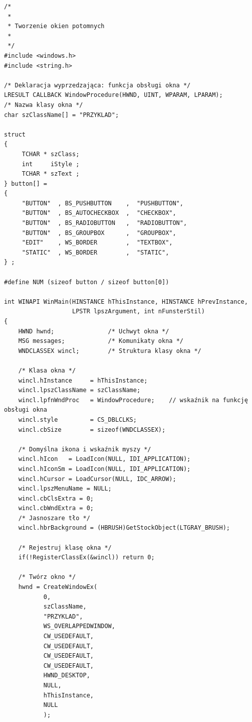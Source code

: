 \begin{scriptsize}
\begin{verbatim}
/*
 *
 * Tworzenie okien potomnych
 *
 */
#include <windows.h>
#include <string.h>

/* Deklaracja wyprzedzająca: funkcja obsługi okna */
LRESULT CALLBACK WindowProcedure(HWND, UINT, WPARAM, LPARAM);
/* Nazwa klasy okna */
char szClassName[] = "PRZYKLAD";

struct
{
     TCHAR * szClass;
     int     iStyle ;
     TCHAR * szText ;
} button[] =
{
     "BUTTON"  , BS_PUSHBUTTON    ,  "PUSHBUTTON",
     "BUTTON"  , BS_AUTOCHECKBOX  ,  "CHECKBOX",
     "BUTTON"  , BS_RADIOBUTTON   ,  "RADIOBUTTON",
     "BUTTON"  , BS_GROUPBOX      ,  "GROUPBOX",
     "EDIT"    , WS_BORDER        ,  "TEXTBOX",
     "STATIC"  , WS_BORDER        ,  "STATIC",
} ;

#define NUM (sizeof button / sizeof button[0])

int WINAPI WinMain(HINSTANCE hThisInstance, HINSTANCE hPrevInstance, 
                   LPSTR lpszArgument, int nFunsterStil)
{
    HWND hwnd;               /* Uchwyt okna */
    MSG messages;            /* Komunikaty okna */
    WNDCLASSEX wincl;        /* Struktura klasy okna */

    /* Klasa okna */
    wincl.hInstance     = hThisInstance;
    wincl.lpszClassName = szClassName;
    wincl.lpfnWndProc   = WindowProcedure;    // wskaźnik na funkcję obsługi okna  
    wincl.style         = CS_DBLCLKS;                 
    wincl.cbSize        = sizeof(WNDCLASSEX);

    /* Domyślna ikona i wskaźnik myszy */
    wincl.hIcon   = LoadIcon(NULL, IDI_APPLICATION);
    wincl.hIconSm = LoadIcon(NULL, IDI_APPLICATION);
    wincl.hCursor = LoadCursor(NULL, IDC_ARROW);
    wincl.lpszMenuName = NULL; 
    wincl.cbClsExtra = 0;   
    wincl.cbWndExtra = 0;   
    /* Jasnoszare tło */
    wincl.hbrBackground = (HBRUSH)GetStockObject(LTGRAY_BRUSH);

    /* Rejestruj klasę okna */
    if(!RegisterClassEx(&wincl)) return 0;

    /* Twórz okno */
    hwnd = CreateWindowEx(
           0,                   
           szClassName,         
           "PRZYKLAD",       
           WS_OVERLAPPEDWINDOW, 
           CW_USEDEFAULT,       
           CW_USEDEFAULT,       
           CW_USEDEFAULT,       
           CW_USEDEFAULT,       
           HWND_DESKTOP,        
           NULL,                
           hThisInstance,       
           NULL                 
           );


\end{verbatim}
\end{scriptsize}
